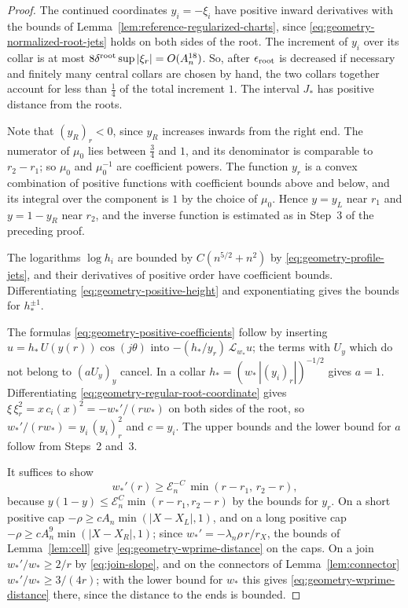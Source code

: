 \begin{proof}
The continued coordinates $y_i=-\xi_i$ have positive inward
derivatives with the bounds of
Lemma~\ref{lem:reference-regularized-charts}, since
\eqref{eq:geometry-normalized-root-jets} holds on both sides of the
root. The increment of $y_i$ over its collar is at most
$8\delta^{\rm root}\sup|\xi_r|=O(A_n^{18})$. So, after
$\epsilon_{\rm root}$ is decreased if necessary and finitely many
central collars are chosen by hand, the two collars together account
for less than $\tfrac14$ of the total increment $1$. The interval
$J_*$ has positive distance from the roots.

Note that $(y_R)_r<0$, since $y_R$ increases inwards from the right
end. The numerator of $\mu_0$ lies between $\tfrac34$ and $1$, and its
denominator is comparable to $r_2-r_1$; so $\mu_0$ and $\mu_0^{-1}$
are coefficient powers. The function $y_r$ is a convex combination of
positive functions with coefficient bounds above and below, and its
integral over the component is $1$ by the choice of $\mu_0$. Hence
$y=y_L$ near $r_1$ and $y=1-y_R$ near $r_2$, and the inverse function
is estimated as in Step~3 of the preceding proof.

The logarithms $\log h_i$ are bounded by $C(n^{5/2}+n^2)$ by
\eqref{eq:geometry-profile-jets}, and their derivatives of positive
order have coefficient bounds. Differentiating
\eqref{eq:geometry-positive-height} and exponentiating gives the
bounds for $h_*^{\pm1}$.

The formulas \eqref{eq:geometry-positive-coefficients} follow by
inserting $u=h_*\,U(y(r))\cos(j\theta)$ into
$-(h_*/y_r)\,\mathscr L_{w_*}u$; the terms with $U_y$ which do not
belong to $(aU_y)_y$ cancel. In a collar
$h_*=(w_*\,|(y_i)_r|)^{-1/2}$ gives $a=1$. Differentiating
\eqref{eq:geometry-regular-root-coordinate} gives
$\xi\,\xi_r^2=x\,c_i(x)^2=-w_*'/(rw_*)$ on both sides of the root, so
$w_*'/(rw_*)=y_i\,(y_i)_r^2$ and $c=y_i$. The upper bounds and the
lower bound for $a$ follow from Steps~2 and~3.

It suffices to show
\begin{equation}\label{eq:geometry-wprime-distance}
 w_*'(r)\ge\mathcal E_n^{-C}\,\min(r-r_1,\,r_2-r),
\end{equation}
because $y(1-y)\le\mathcal E_n^{C}\min(r-r_1,r_2-r)$ by the bounds
for $y_r$. On a short positive cap
$-\rho\ge cA_n\min(|X-X_L|,1)$, and on a long positive cap
$-\rho\ge cA_n^9\min(|X-X_R|,1)$; since
$w_*'=-\lambda_n\rho\,r/r_X$, the bounds of Lemma~\ref{lem:cell} give
\eqref{eq:geometry-wprime-distance} on the caps. On a join
$w_*'/w_*\ge2/r$ by \eqref{eq:join-slope}, and on the connectors of
Lemma~\ref{lem:connector} $w_*'/w_*\ge3/(4r)$; with the lower bound
for $w_*$ this gives \eqref{eq:geometry-wprime-distance} there, since
the distance to the ends is bounded.
\end{proof}

